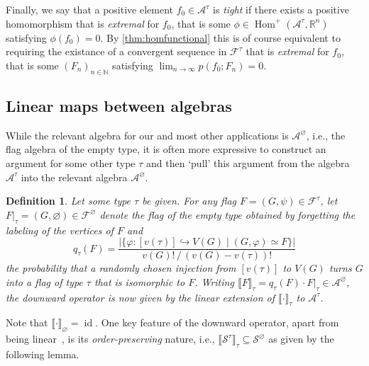 \documentclass[a4paper,11pt]{article}
\newtheorem{definition}[theorem]{Definition}
\numberwithin{equation}{section}
\newcommand{\mA}{\mathcal{A}}
\newcommand{\mF}{\mathcal{F}}
\newcommand{\mS}{\mathcal{S}}
\newcommand{\RR}{\mathbb{R}}
\newcommand{\NN}{\mathbb{N}}
\begin{document}
Finally, we say that a positive element $f_0 \in \mA^\tau$ is \emph{tight} if there exists a positive homomorphism that is \emph{extremal} for $f_0$, that is some $\phi \in \operatorname{Hom}^+(\mA^\tau, \RR^n)$ satisfying $\phi(f_0) = 0$. By \cref{thm:homfunctional} this is of course equivalent to requiring the existance of a convergent sequence in $\mF^\tau$ that is \emph{extremal} for $f_0$, that is some $(F_n)_{n \in \NN}$ satisfying $\lim_{n \to \infty} p(f_0; F_n) = 0$.

\subsection{Linear maps between algebras}

While the relevant algebra for our and most other applications is $\mA^\varnothing$, i.e., the flag algebra of the empty type, it is often more expressive to construct an argument for some other type $\tau$ and then {\lq}pull{\rq} this argument from the algebra $\mA^\tau$ into the relevant algebra $\mA^\varnothing$.
%
\begin{definition} \label{def:downward}
    Let some type $\tau$ be given. For any flag $F = (G, \psi) \in \mF^\tau$, let $F \vert_\tau = (G, \varnothing) \in \mF^\varnothing$ denote the flag of the empty type obtained by forgetting the labeling of the vertices of $F$ and
    \begin{equation*}
        q_\tau(F) = \frac{|\{\varphi : [v(\tau)] \hookrightarrow V(G) \mid (G, \varphi) \simeq F \}|}{v(G)! \, / \, (v(G)-v(\tau))!}
    \end{equation*}
    the probability that a randomly chosen injection from $[v(\tau)]$ to $V(G)$ turns $G$ into a flag of type $\tau$ that is isomorphic to $F$. Writing $\llbracket F \rrbracket_\tau = q_\tau(F) \cdot F \vert_\tau \in \mA^\varnothing$, the \emph{downward operator} is now given by the linear extension of $\llbracket \cdot \rrbracket_\tau$ to $\mA^\tau$.
\end{definition}
%
Note that $\llbracket \cdot \rrbracket_\varnothing = \operatorname{id}$. One key feature of the downward operator, apart from being linear~\cite[Theorem 2.5]{Razborov_2007}, is its \emph{order-preserving} nature, i.e., $\llbracket \mS^\tau \rrbracket_{\tau} \subseteq \mS^\varnothing$ as given by the following lemma.
\end{document}
